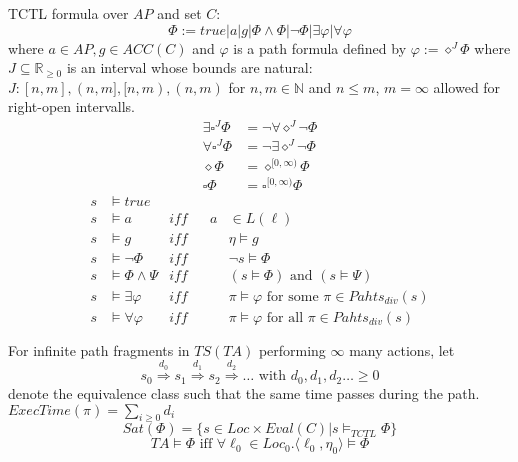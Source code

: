 \documentclass[a4paper, 10pt]{article}
\begin{document}
\begin{mdframed}[roundcorner=5pt,
subtitlebelowline=false,subtitleaboveline=false,
subtitlebackgroundcolor=blue!30,
frametitlerule=true,
frametitlebackgroundcolor=blue!30,
frametitle={Syntax of Timed CTL (TCTL)}
]
TCTL formula over $AP$ and set $C$:
\[ \Phi:= true | a | g | \Phi\wedge\Phi | \neg\Phi | \exists\varphi | \forall\varphi \]
where $a\in AP, g\in ACC(C)$ and $\varphi$ is a path formula defined by $\varphi:=\diamond^J\Phi$ where
$J\subseteq\mathds{R}_{\geq0}$ is an interval whose bounds are natural: $J:[n,m], (n,m], [n,m), (n,m)$ for $n,m\in\mathds{N}$ and $n\leq m$, $m=\infty$ allowed for right-open intervalls.
\\
\begin{align*}
\exists\square^J\Phi&=\neg\forall\diamond^J\neg\Phi \\
\forall\square^J\Phi&= \neg\exists\diamond^J\neg\Phi \\
\diamond\Phi&=\diamond^{[0,\infty)}\Phi \\
\square\Phi&=\square^{[0,\infty)}\Phi
\end{align*}
\begin{align*}
s&\models true \\
s&\models a &iff&& a&\in L(\ell) \\
s&\models g &iff&& & \eta\models g\\
s&\models \neg\Phi &iff&& & \neg s\models\Phi\\
s&\models \Phi\wedge\Psi &iff&& & (s\models\Phi) \text{ and }(s\models\Psi) \\
s&\models \exists\varphi &iff&& & \pi\models\varphi \text{ for some } \pi\in Pahts_{div}(s) \\
s&\models \forall\varphi &iff&& & \pi\models\varphi \text{ for all } \pi\in Pahts_{div}(s) \\\\
\end{align*}
For infinite path fragments in $TS(TA)$ performing $\infty$ many actions, let
\[s_0\overset{d_0}{\Longrightarrow}s_1\overset{d_1}{\Longrightarrow}s_2\overset{d_2}{\Longrightarrow}\dots \text{ with } d_0,d_1,d_2\dots \geq0\]
denote the equivalence class such that the same time passes during the path. $ExecTime(\pi)=\sum_{i\geq0}d_i$
\[Sat(\Phi) = \{s\in Loc\times Eval(C) | s\models_{TCTL}\Phi\}\]
\[TA\models\Phi \text{ iff } \forall\ell_0\in Loc_0.\langle\ell_0,\eta_0\rangle\models\Phi\]

\end{mdframed}
\end{document}

